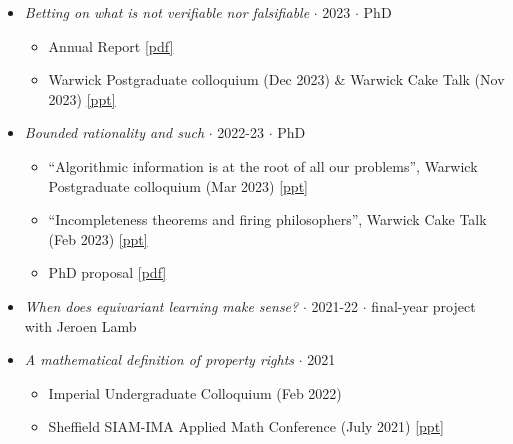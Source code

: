 \documentclass{article}
\begin{document}
\begin{itemize}

    \item \emph{Betting on what is not verifiable nor falsifiable} $\cdot$ 2023 $\cdot$ PhD
    
    \begin{itemize}
        \item Annual Report \href{https://drive.google.com/file/d/1qNZjvwNXTKl8KHc1_m-vPnJyWvpT_-yi/view?usp=sharing}{[pdf]}
        
        \item Warwick Postgraduate colloquium (Dec 2023) \& Warwick Cake Talk (Nov 2023) \href{https://drive.google.com/file/d/1qvkmYbPsZ9kVE1WPljcPSpXZq7wphDqt/view?usp=sharing}{[ppt]}
    \end{itemize}
    
    \item \emph{Bounded rationality and such} $\cdot$ 2022-23 $\cdot$ PhD

    \begin{itemize}
        \item ``Algorithmic information is at the root of all our problems'', Warwick Postgraduate colloquium (Mar 2023) \href{https://drive.google.com/file/d/1auYDhlsq1i0ZhTs3UsfuuUXYViS9UnqS/view?usp=sharing}{[ppt]}
        \item ``Incompleteness theorems and firing philosophers'', Warwick Cake Talk (Feb 2023) \href{https://drive.google.com/file/d/1IrAc8RWr6gsGurXND3baNWEGaEJP6Tjb/view?usp=sharing}{[ppt]}
        \item PhD proposal \href{https://drive.google.com/file/d/1EK045SAo025lGJtmkOOYI7sIzzIQF03K/view?usp=sharing}{[pdf]}
    \end{itemize}

    \item \emph{When does equivariant learning make sense?} $\cdot$ 2021-22 $\cdot$ final-year project with Jeroen Lamb
        
    \item \emph{A mathematical definition of property rights} $\cdot$ 2021 

    \begin{itemize}
        \item Imperial Undergraduate Colloquium (Feb 2022)
        \item Sheffield SIAM-IMA Applied Math Conference (July 2021) \href{https://drive.google.com/file/d/1AjYV2bo33F7Cm6vmzD1PBA_8L3cnMQ0S/view?usp=sharing}{[ppt]}
    \end{itemize}


\end{itemize}
\end{document}
